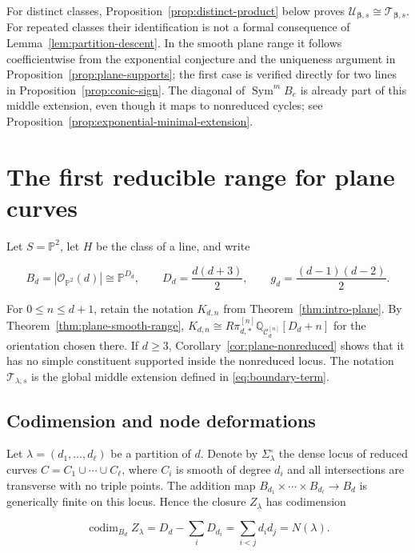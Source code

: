 \documentclass[11pt,reqno]{amsart}
\theoremstyle{definition}
\newcommand{\Q}{\mathbb Q}
\newcommand{\Pp}{\mathbb P}
\newcommand{\Ocal}{\mathcal O}
\newcommand{\codim}{\operatorname{codim}}
\begin{document}
For distinct classes, Proposition~\ref{prop:distinct-product} below proves
$\mathcal U_{\boldsymbol\beta,s}\cong
\mathcal T_{\boldsymbol\beta,s}$.  For repeated classes their identification
is not a formal consequence of Lemma~\ref{lem:partition-descent}.  In the
smooth plane range it follows coefficientwise from the exponential conjecture
and the uniqueness argument in Proposition~\ref{prop:plane-supports}; the
first case is verified directly for two lines in
Proposition~\ref{prop:conic-sign}.  The diagonal of
$\operatorname{Sym}^{m}B_e$ is already part of this middle extension, even
though it maps to nonreduced cycles; see
Proposition~\ref{prop:exponential-minimal-extension}.

\section{The first reducible range for plane curves}\label{sec:plane}

Let $S=\Pp^2$, let $H$ be the class of a line, and write

\[
  B_d=|\Ocal_{\Pp^2}(d)|\cong\Pp^{D_d},
  \qquad
  D_d=\frac{d(d+3)}2,
  \qquad
  g_d=\frac{(d-1)(d-2)}2.
\]

For $0\le n\le d+1$, retain the notation $K_{d,n}$ from
Theorem~\ref{thm:intro-plane}.  By
Theorem~\ref{thm:plane-smooth-range},
$K_{d,n}\cong
R\pi_{d,*}^{[n]}\Q_{\mathcal C_d^{[n]}}[D_d+n]$
for the orientation chosen there.  If $d\ge3$,
Corollary~\ref{cor:plane-nonreduced} shows that it has no simple constituent
supported inside the nonreduced locus.  The notation
$\mathcal T_{\lambda,s}$ is the global middle extension defined in
\eqref{eq:boundary-term}.

\subsection{Codimension and node deformations}

Let $\lambda=(d_1,\ldots,d_\ell)$ be a partition of $d$.  Denote by
$\Sigma_\lambda^\circ$ the dense locus of reduced curves
$C=C_1\cup\cdots\cup C_\ell$, where $C_i$ is smooth of degree $d_i$
and all intersections are transverse with no triple points.  The addition map
$B_{d_1}\times\cdots\times B_{d_\ell}\to B_d$ is generically finite on
this locus.  Hence the closure $Z_\lambda$ has
codimension

\begin{equation}\label{eq:plane-partition-codim}
  \codim_{B_d}Z_\lambda
  =D_d-\sum_iD_{d_i}
  =\sum_{i<j}d_i d_j
  =N(\lambda).
\end{equation}
\end{document}
